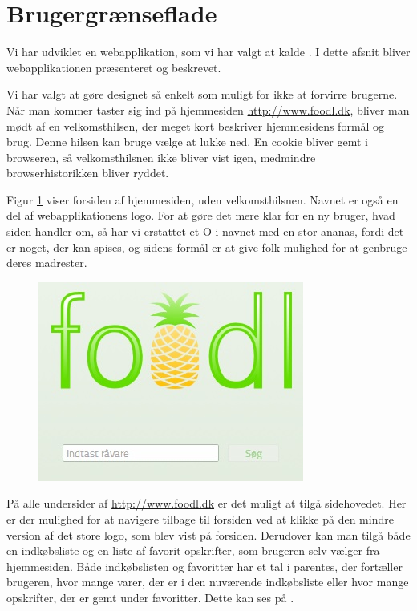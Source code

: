\section{Brugergrænseflade}
\label{sec:webapplikationen}
Vi har udviklet en webapplikation, som vi har valgt at kalde \Foodl. I dette afsnit bliver webapplikationen præsenteret og beskrevet.

Vi har valgt at gøre designet så enkelt som muligt for ikke at forvirre brugerne. Når man kommer taster sig ind på hjemmesiden \url{http://www.foodl.dk}, bliver man mødt af en velkomsthilsen, der meget kort beskriver hjemmesidens formål og brug. Denne hilsen kan bruge vælge at lukke ned. En cookie bliver gemt i browseren, så velkomsthilsnen ikke bliver vist igen, medmindre browserhistorikken bliver ryddet.

Figur \ref{fig:foodl-forside} viser forsiden af hjemmesiden, uden velkomsthilsnen. Navnet \Foodl er også en del af webapplikationens logo. For at gøre det mere klar for en ny bruger, hvad siden handler om, så har vi erstattet et O i navnet med en stor ananas, fordi det er noget, der kan spises, og sidens formål er at give folk mulighed for at genbruge deres madrester. 

\begin{figure}[H]
	\centering
	\includegraphics[scale=0.7]{billeder/foodl/forside.jpg}
	\label{fig:foodl-forside}
\end{figure}

På alle undersider af \url{http://www.foodl.dk} er det muligt at tilgå sidehovedet. Her er der mulighed for at navigere tilbage til forsiden ved at klikke på den mindre version af det store logo, som blev vist på forsiden. Derudover kan man tilgå både en indkøbsliste og en liste af favorit-opskrifter, som brugeren selv vælger fra hjemmesiden. Både indkøbslisten og favoritter har et tal i parentes, der \fx fortæller brugeren, hvor mange varer, der er i den nuværende indkøbsliste eller hvor mange opskrifter, der er gemt under favoritter. Dette kan ses på .

